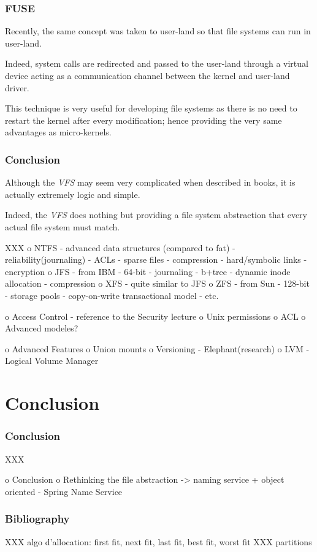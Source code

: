
\begin{frame}
  \frametitle{FUSE}

  Recently, the same concept was taken to user-land so that file systems
  can run in user-land.

  \-

  Indeed, system calls are redirected and passed to the user-land through
  a virtual device acting as a communication channel between the kernel
  and user-land driver.

  \-

  This technique is very useful for developing file systems as there is
  no need to restart the kernel after every modification; hence providing the
  very same advantages as micro-kernels.
\end{frame}


\begin{frame}
  \frametitle{Conclusion}

  Although the \textit{VFS} may seem very complicated when described in
  books, it is actually extremely logic and simple.

  \-

  Indeed, the \textit{VFS} does nothing but providing a file system abstraction
  that every actual file system must match.
\end{frame}

XXX
 o NTFS
  - advanced data structures (compared to fat)
  - reliability(journaling)
  - ACLs
  - sparse files
  - compression
  - hard/symbolic links
  - encryption
 o JFS
  - from IBM
  - 64-bit
  - journaling
  - b+tree
  - dynamic inode allocation
  - compression
 o XFS
  - quite similar to JFS
 o ZFS
  - from Sun
  - 128-bit
  - storage pools
  - copy-on-write transactional model
  - etc.

o Access Control
 - reference to the Security lecture
 o Unix permissions
 o ACL
 o Advanced modeles?

o Advanced Features
 o Union mounts
 o Versioning
   - Elephant(research)
 o LVM - Logical Volume Manager

%
%

\section{Conclusion}


\begin{frame}
  \frametitle{Conclusion}

  XXX
\end{frame}

o Conclusion
 o Rethinking the file abstraction -> naming service + object oriented
   - Spring Name Service

%
%

\begin{frame}
  \frametitle{Bibliography}

  
  
\end{frame}



XXX algo d'allocation: first fit, next fit, last fit, best fit, worst fit
XXX partitions
